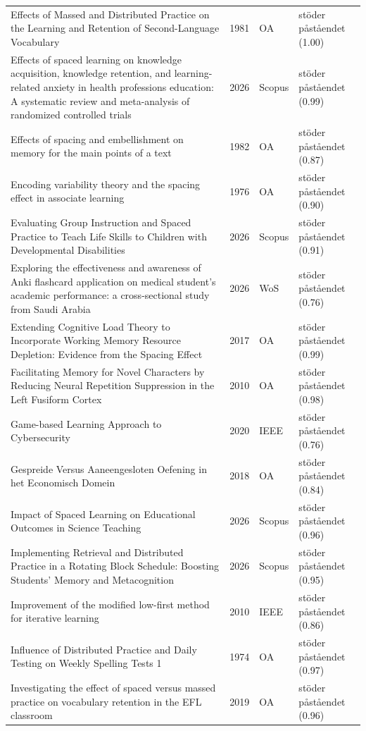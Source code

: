 \begin{longtable}{@{}%
  >{\raggedright\arraybackslash}p{}c%
  >{\raggedright\arraybackslash}p{}%
  >{\raggedright\arraybackslash}p{}@{}}
Effects of Massed and Distributed Practice on the Learning and Retention of Second-Language Vocabulary & 1981 & OA & stöder påståendet (1.00) \\
Effects of spaced learning on knowledge acquisition, knowledge retention, and learning-related anxiety in health professions education: A systematic review and meta-analysis of randomized controlled trials & 2026 & Scopus & stöder påståendet (0.99) \\
Effects of spacing and embellishment on memory for the main points of a text & 1982 & OA & stöder påståendet (0.87) \\
Encoding variability theory and the spacing effect in associate learning & 1976 & OA & stöder påståendet (0.90) \\
Evaluating Group Instruction and Spaced Practice to Teach Life Skills to Children with Developmental Disabilities & 2026 & Scopus & stöder påståendet (0.91) \\
Exploring the effectiveness and awareness of Anki flashcard application on medical student's academic performance: a cross-sectional study from Saudi Arabia & 2026 & WoS & stöder påståendet (0.76) \\
Extending Cognitive Load Theory to Incorporate Working Memory Resource Depletion: Evidence from the Spacing Effect & 2017 & OA & stöder påståendet (0.99) \\
Facilitating Memory for Novel Characters by Reducing Neural Repetition Suppression in the Left Fusiform Cortex & 2010 & OA & stöder påståendet (0.98) \\
Game-based Learning Approach to Cybersecurity & 2020 & IEEE & stöder påståendet (0.76) \\
Gespreide Versus Aaneengesloten Oefening in het Economisch Domein & 2018 & OA & stöder påståendet (0.84) \\
Impact of Spaced Learning on Educational Outcomes in Science Teaching & 2026 & Scopus & stöder påståendet (0.96) \\
Implementing Retrieval and Distributed Practice in a Rotating Block Schedule: Boosting Students' Memory and Metacognition & 2026 & Scopus & stöder påståendet (0.95) \\
Improvement of the modified low-first method for iterative learning & 2010 & IEEE & stöder påståendet (0.86) \\
Influence of Distributed Practice and Daily Testing on Weekly Spelling Tests 1 & 1974 & OA & stöder påståendet (0.97) \\
Investigating the effect of spaced versus massed practice on vocabulary retention in the EFL classroom & 2019 & OA & stöder påståendet (0.96) \\

\end{longtable}

